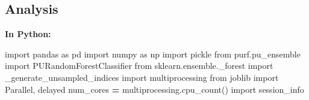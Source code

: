 \documentclass[
  11pt,
  oneside]{book}
\newenvironment{Shaded}{\begin{snugshade}}{\end{snugshade}}
\newcommand{\ImportTok}[1]{#1}
\newcommand{\NormalTok}[1]{#1}
\newcommand{\OperatorTok}[1]{\textcolor[rgb]{0.81,0.36,0.00}{\textbf{#1}}}
\begin{document}
\hypertarget{analysis-5}{%
\subsection{Analysis}\label{analysis-5}}

\textbf{In Python: }

\begin{Shaded}
\begin{Highlighting}[]
\ImportTok{import}\NormalTok{ pandas }\ImportTok{as}\NormalTok{ pd}
\ImportTok{import}\NormalTok{ numpy }\ImportTok{as}\NormalTok{ np}
\ImportTok{import}\NormalTok{ pickle}
\ImportTok{from}\NormalTok{ purf.pu\_ensemble }\ImportTok{import}\NormalTok{ PURandomForestClassifier}
\ImportTok{from}\NormalTok{ sklearn.ensemble.\_forest }\ImportTok{import}\NormalTok{ \_generate\_unsampled\_indices}
\ImportTok{import}\NormalTok{ multiprocessing}
\ImportTok{from}\NormalTok{ joblib }\ImportTok{import}\NormalTok{ Parallel, delayed}
\NormalTok{num\_cores }\OperatorTok{=}\NormalTok{ multiprocessing.cpu\_count()}
\ImportTok{import}\NormalTok{ session\_info}
\end{Highlighting}
\end{Shaded}
\end{document}
